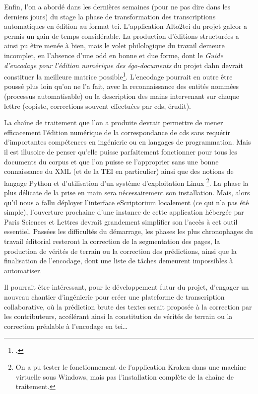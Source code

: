 \documentclass[a4paper,12pt,twoside]{book}
\begin{document}
		Enfin, l'on a abordé dans les dernières semaines (pour ne pas dire dans les derniers jours) du stage la phase de transformation des transcriptions automatiques en édition au format \gls{tei}. L'application Alto2tei du projet \gls{galcor} a permis un gain de temps considérable. La production d'éditions structurées a ainsi pu être menée à bien, mais le volet philologique du travail demeure incomplet, en l'absence d'une \gls{odd} en bonne et due forme, dont le \textit{Guide d'encodage pour l'édition numérique des égo-documents} du projet \gls{dahn} devrait constituer la meilleure matrice possible\footcite{chiffoleauGuideEncodagePour2022}. L'encodage pourrait en outre être poussé plus loin qu'on ne l'a fait, avec la reconnaissance des entités nommées (processus automatisable) ou la description des mains intervenant sur chaque lettre (copiste, corrections souvent effectuées par \gls{cds}, érudit).
		
		La chaîne de traitement que l'on a produite devrait permettre de mener efficacement l'édition numérique de la correspondance de \gls{cds} sans requérir d'importantes compétences en ingénierie ou en langages de programmation. Mais il est illusoire de penser qu'elle puisse parfaitement fonctionner pour tous les documents du corpus et que l'on puisse se l'approprier sans une bonne connaissance du XML (et de la TEI en particulier) ainsi que des notions de langage Python et d'utilisation d'un système d'exploitation Linux%
		\footnote{On a pu tester le fonctionnement de l'application Kraken dans une machine virtuelle sous Windows, mais pas l'installation complète de la chaîne de traitement.}. %
		La phase la plus délicate de la prise en main sera nécessairement son installation. Mais, alors qu'il nous a fallu déployer l'interface eScriptorium localement (ce qui n'a pas été simple), l'ouverture prochaine d'une instance de cette application hébergée par Paris Sciences et Lettres devrait grandement simplifier son l'accès à cet outil essentiel. 	
		Passées les difficultés du démarrage, les phases les plus chronophages du travail éditorial resteront la correction de la \gls{segmentation} des pages, la production de vérités de terrain ou la correction des \glspl{prédiction}, ainsi que la finalisation de l'encodage, dont une liste de tâches demeurent impossibles à automatiser.
		
		Il pourrait être intéressant, pour le développement futur du projet, d'engager un nouveau chantier d'ingénierie pour créer une plateforme de transcription collaborative, où la prédiction brute des textes serait proposée à la correction par les contributeurs, accélérant ainsi la constitution de vérités de terrain ou la correction préalable à l'encodage en \gls{tei}… 
		
\end{document}
